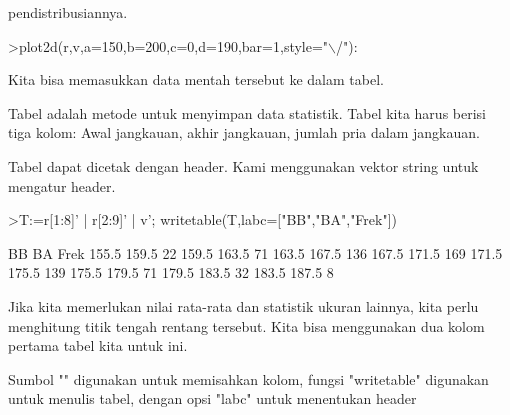 \documentclass[a4paper,10pt]{article}
\begin{document}
\begin{eulernotebook}
\begin{eulercomment}
\begin{eulercomment}
\begin{eulercomment}
\begin{eulercomment}
\begin{eulercomment}
\begin{eulercomment}
\begin{eulercomment}
\begin{eulercomment}
\begin{eulercomment}
\begin{eulercomment}
\begin{eulercomment}
\begin{eulercomment}
\begin{eulercomment}
\begin{eulercomment}
\begin{eulercomment}
\begin{eulercomment}
\begin{eulercomment}
\begin{eulercomment}
\begin{eulercomment}
\begin{eulercomment}
\begin{eulercomment}
\begin{eulercomment}
\begin{eulercomment}
\begin{eulercomment}
\begin{eulercomment}
\begin{eulercomment}
\begin{eulercomment}
\begin{eulercomment}
\begin{eulercomment}
\begin{eulercomment}
\begin{eulercomment}
\begin{eulercomment}
\begin{eulercomment}
\begin{eulercomment}
\begin{eulercomment}
\begin{eulercomment}
\begin{eulercomment}
\begin{eulercomment}
\begin{eulercomment}
\begin{eulercomment}
\begin{eulercomment}
\begin{eulercomment}
\begin{eulercomment}
\begin{eulercomment}
\begin{eulercomment}
\begin{eulercomment}
\begin{eulercomment}
\begin{eulercomment}
\begin{eulercomment}
\begin{eulercomment}
\begin{eulercomment}
\begin{eulercomment}
\begin{eulercomment}
\begin{eulercomment}
\begin{eulercomment}
\begin{eulercomment}
\begin{eulercomment}
\begin{eulercomment}
\begin{eulercomment}
\begin{eulercomment}
\begin{eulercomment}
\begin{eulercomment}
\begin{eulercomment}
\begin{eulercomment}
\begin{eulercomment}
\begin{eulercomment}
\begin{eulercomment}
pendistribusiannya.
\end{eulercomment}
\begin{eulerprompt}
>plot2d(r,v,a=150,b=200,c=0,d=190,bar=1,style="\(\backslash\)/"):
\end{eulerprompt}
\begin{eulercomment}
Kita bisa memasukkan data mentah tersebut ke dalam tabel.

Tabel adalah metode untuk menyimpan data statistik. Tabel kita harus
berisi tiga kolom: Awal jangkauan, akhir jangkauan, jumlah pria dalam
jangkauan.

Tabel dapat dicetak dengan header. Kami menggunakan vektor string
untuk mengatur header.
\end{eulercomment}
\begin{eulerprompt}
>T:=r[1:8]' | r[2:9]' | v'; writetable(T,labc=["BB","BA","Frek"])
\end{eulerprompt}
\begin{euleroutput}
          BB        BA      Frek
       155.5     159.5        22
       159.5     163.5        71
       163.5     167.5       136
       167.5     171.5       169
       171.5     175.5       139
       175.5     179.5        71
       179.5     183.5        32
       183.5     187.5         8
\end{euleroutput}
\begin{eulercomment}
Jika kita memerlukan nilai rata-rata dan statistik ukuran lainnya,
kita perlu menghitung titik tengah rentang tersebut. Kita bisa
menggunakan dua kolom pertama tabel kita untuk ini.

Sumbol "\textbar{}" digunakan untuk memisahkan kolom, fungsi "writetable"
digunakan untuk menulis tabel, dengan opsi "labc" untuk menentukan
header 
\end{eulercomment}
\end{eulercomment}
\end{eulercomment}
\end{eulercomment}
\end{eulercomment}
\end{eulercomment}
\end{eulercomment}
\end{eulercomment}
\end{eulercomment}
\end{eulercomment}
\end{eulercomment}
\end{eulercomment}
\end{eulercomment}
\end{eulercomment}
\end{eulercomment}
\end{eulercomment}
\end{eulercomment}
\end{eulercomment}
\end{eulercomment}
\end{eulercomment}
\end{eulercomment}
\end{eulercomment}
\end{eulercomment}
\end{eulercomment}
\end{eulercomment}
\end{eulercomment}
\end{eulercomment}
\end{eulercomment}
\end{eulercomment}
\end{eulercomment}
\end{eulercomment}
\end{eulercomment}
\end{eulercomment}
\end{eulercomment}
\end{eulercomment}
\end{eulercomment}
\end{eulercomment}
\end{eulercomment}
\end{eulercomment}
\end{eulercomment}
\end{eulercomment}
\end{eulercomment}
\end{eulercomment}
\end{eulercomment}
\end{eulercomment}
\end{eulercomment}
\end{eulercomment}
\end{eulercomment}
\end{eulercomment}
\end{eulercomment}
\end{eulercomment}
\end{eulercomment}
\end{eulercomment}
\end{eulercomment}
\end{eulercomment}
\end{eulercomment}
\end{eulercomment}
\end{eulercomment}
\end{eulercomment}
\end{eulercomment}
\end{eulercomment}
\end{eulercomment}
\end{eulercomment}
\end{eulercomment}
\end{eulercomment}
\end{eulercomment}
\end{eulercomment}
\end{eulernotebook}
\end{document}
